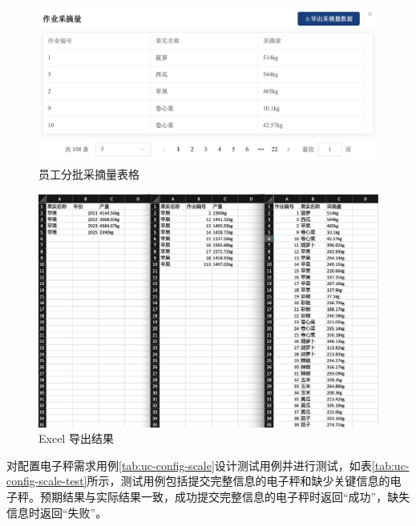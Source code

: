 \begin{figure}
    \centering
    \includegraphics[width=0.9\linewidth]{../result/chart-user-works.png}
    \caption{员工分批采摘量表格}
    \label{fig:chart-user-works}
\end{figure}

\begin{figure}
    \centering
    \includegraphics[width=0.9\linewidth]{../result/chart-excels.png}
    \caption{Excel 导出结果}
    \label{fig:chart-excels}
\end{figure}

对配置电子秤需求用例\ref{tab:uc-config-scale}设计测试用例并进行测试，如表\ref{tab:uc-config-scale-test}所示，测试用例包括提交完整信息的电子秤和缺少关键信息的电子秤。预期结果与实际结果一致，成功提交完整信息的电子秤时返回“成功”，缺失信息时返回“失败”。

